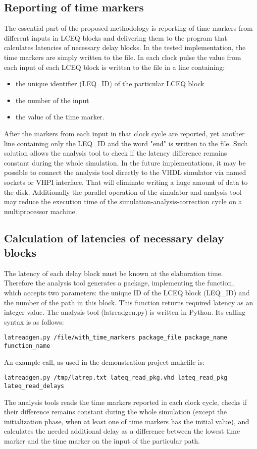 \documentclass[preprint,11pt]{elsarticle}
\begin{document}
\subsection{Reporting of time markers}
The essential part of the proposed methodology is reporting of time markers from different inputs in LCEQ blocks and delivering them to the program that calculates
latencies of necessary delay blocks.
In the tested implementation, the time markers are simply written to the file. In each clock pulse the value from each input of each LCEQ block is written to the file
in a line containing:
\begin{itemize}
\item the unique identifier (LEQ\_ID) of the particular LCEQ block
\item the number of the input
\item the value of the time marker.
\end{itemize}
After the markers from each input in that clock cycle are reported, yet another
line containing only the LEQ\_ID and the word "end" is written to the file.
Such solution allows the analysis tool to check if the latency difference remains
constant during the whole simulation.
In the future implementations, it may be possible to connect the analysis tool directly 
to the VHDL simulator via named sockets or VHPI interface. That will eliminate
writing a huge amount of data to the disk. Additionally the parallel operation of the simulator and analysis tool may reduce the execution time of the simulation-analysis-correction cycle on a multiprocessor machine.
\subsection{Calculation of latencies of necessary delay blocks}
The latency of each delay block must be known at the elaboration time.
Therefore the analysis tool generates a package, implementing the function,
which accepts two parameters: the unique ID of the LCEQ block (LEQ\_ID) and the number
of the path in this block. This function returns required latency as an integer value.
The analysis tool (latreadgen.py) is written in Python. Its calling syntax is
as follows:
\begin{verbatim}
latreadgen.py /file/with_time_markers package_file package_name function_name
\end{verbatim}
An example call, as used in the demonstration project makefile is:
\begin{verbatim}
latreadgen.py /tmp/latrep.txt lateq_read_pkg.vhd lateq_read_pkg lateq_read_delays
\end{verbatim}
The analysis tools reads the time markers reported in each clock cycle,
checks if their difference remains constant during the whole simulation (except 
the initialization phase, when at least one of time markers has the initial value),
and calculates the needed additional delay as a difference between the lowest time
marker and the time marker on the input of the particular path.
\end{document}
